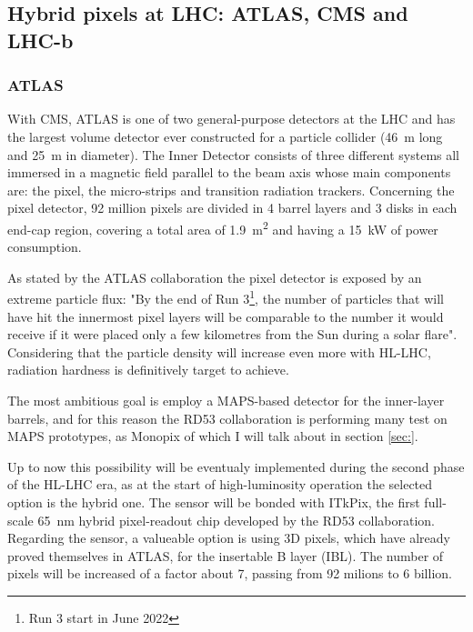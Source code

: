     \subsection{Hybrid pixels at LHC: ATLAS, CMS and LHC-b}
        \subsubsection{ATLAS}    
        With CMS, ATLAS is one of two general-purpose detectors at the LHC and has the largest volume detector ever constructed for a particle
        collider (\SI{46}{m} long and \SI{25}{m} in diameter).  
        The Inner Detector consists of three different systems all immersed in a magnetic field parallel to the beam axis whose main components are: the pixel, the micro-strips and transition radiation trackers. Concerning the pixel detector, 92 million pixels are divided in 4 barrel layers and 3 disks in each end-cap region, covering a total area of \SI{1.9}{m\squared} and having a \SI{15}{kW} of power consumption.

        As stated by the ATLAS collaboration the pixel detector is exposed by an extreme particle flux: "By the end of Run 3\footnote{Run 3 start in June 2022}, the number of particles that will have hit the innermost pixel layers will be comparable to the number it would receive if it were placed only a few kilometres from the Sun during a solar flare". Considering that the particle density will increase even more with HL-LHC, radiation hardness is definitively target to achieve. 

        The most ambitious goal is employ a MAPS-based detector for the inner-layer barrels, and for this reason the RD53 collaboration is performing many test on MAPS prototypes, as Monopix of which I will talk about in section \ref{sec:}.
        
        Up to now this possibility will be eventualy implemented during the second phase of the HL-LHC era, as at the start of high-luminosity operation the selected option is the hybrid one. The sensor will be bonded with ITkPix, the first full-scale \SI{65}{nm} hybrid pixel-readout chip developed by the RD53 collaboration.
        Regarding the sensor, a valueable option is using 3D pixels, which have already proved themselves in ATLAS, for the insertable B layer (IBL).
        The number of pixels will be increased of a factor about 7, passing from 92 milions to 6 billion.
    
